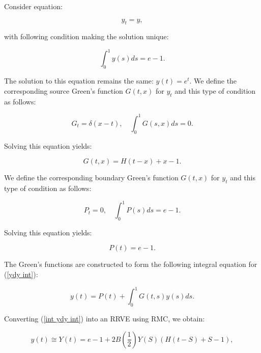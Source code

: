 \documentclass[a4paper,12pt]{article}
\begin{document}
\begin{example}[$y_t=y$ average condition]
  Consider equation:

  \begin{equation} \label{ydy int}
    y_t = y,
  \end{equation}

  with following condition making the solution unique:

  \begin{equation}
    \int_{0}^{1} y(s) ds = e-1.
  \end{equation}

  The solution to this equation remains the same: $y(t) = e^{t}$.
  We define the corresponding source Green's function $G(t,x)$ for $y_t$
  and this type of condition as follows:

  \begin{equation}
    G_t = \delta(x-t), \quad \int_{0}^{1} G(s,x) ds = 0.
  \end{equation}

  Solving this equation yields:

  \begin{equation}
    G(t,x) = H(t-x) + x - 1.
  \end{equation}

  We define the corresponding boundary Green's function $G(t,x)$ for $y_t$
  and this type of condition as follows:

  \begin{equation}
    P_{t} = 0, \quad \int_{0}^{1} P(s) ds = e -1.
  \end{equation}

  Solving this equation yields:

  \begin{equation}
    P(t) = e -1.
  \end{equation}

  The Green's functions are constructed
  to form the following integral equation
  for (\ref{ydy int}):

  \begin{equation} \label{int ydy int}
    y(t) = P(t) + \int_{0}^{1} G(t,s) y(s) ds.
  \end{equation}

  Converting (\ref{int ydy int}) into an RRVE
  using RMC, we obtain:

  \begin{equation}\label{RRVE ydy int}
    y(t) \cong Y(t) = e - 1 + 2B\left(\frac{1}{2}\right)Y(S)(H(t-S)+S-1),
  \end{equation}


\end{example}
\end{document}
